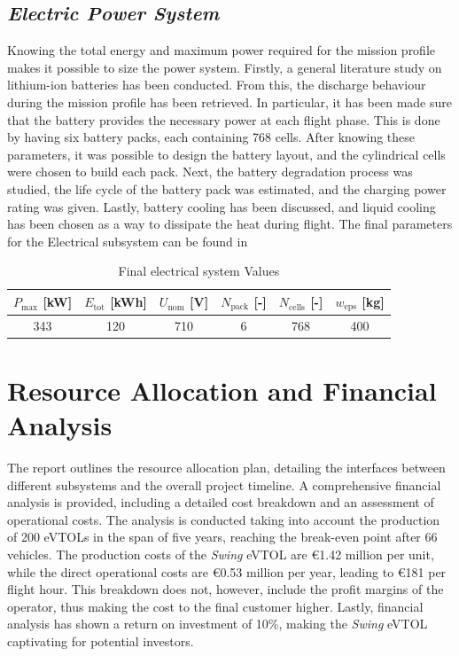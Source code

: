 \subsection*{\textit{Electric Power System}}
Knowing the total energy and maximum power required for the mission profile makes it possible to size the power system.
Firstly, a general literature study on lithium-ion batteries has been conducted.
From this, the discharge behaviour during the mission profile has been retrieved.
In particular, it has been made sure that the battery provides the necessary power at each flight phase.
This is done by having six battery packs, each containing 768 cells.
After knowing these parameters, it was possible to design the battery layout, and the cylindrical cells were chosen to build each pack.
Next, the battery degradation process was studied, the life cycle of the battery pack was estimated, and the charging power rating was given.
Lastly, battery cooling has been discussed, and liquid cooling has been chosen as a way to dissipate the heat during flight. The final parameters for the Electrical subsystem can be found in 
\begin{table}[H]
\caption{Final electrical system Values}
\label{tab_exe:FinalEPSValues}
\centering
\begin{tabular}{cccccc}
    \toprule
$P_{\max}$ [kW] & $E_{\text{tot}}$ [kWh] & $U_{\text{nom}}$ [V] & $N_{\text{pack}}$ [-] & $N_{\text{cells}}$ [-] & $w_{\text{eps}}$ [kg]  \\\midrule
    343   & 120              & 710       & 6        & 768       & 400  \\
    \bottomrule
\end{tabular}
\end{table}



\section*{Resource Allocation and Financial Analysis}
The report outlines the resource allocation plan, detailing the interfaces between different subsystems and the overall project timeline.
A comprehensive financial analysis is provided,
including a detailed cost breakdown and an assessment of operational costs.
The analysis is conducted taking into account the production of 200 eVTOLs in the span of five years,
reaching the break-even point after 66 vehicles.
The production costs of the \textit{Swing} eVTOL are €1.42 million per unit, while the direct operational costs are €0.53 million per year, leading to €181 per flight hour. This breakdown does not, however, include the profit margins of the operator, thus making the cost to the final customer higher. Lastly, financial analysis has shown a return on investment of 10\%, making the \textit{Swing} eVTOL captivating for potential investors.

